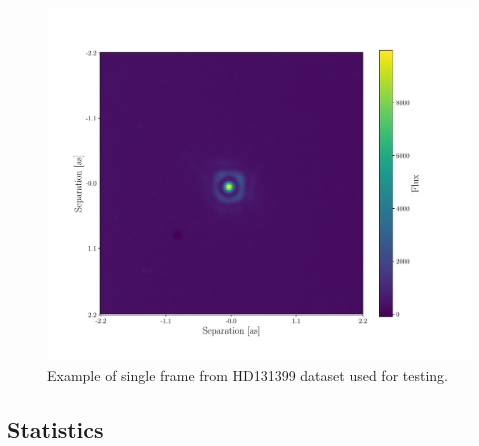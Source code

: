 \documentclass[twocolumn,fleqn]{aastex62}
\begin{document}
\begin{figure}[h]
	\hspace{-2.5em}
	\includegraphics[width=1.25\linewidth]{HD131399}
	\caption{\label{fig:TestData} Example of single frame from HD131399 dataset used for testing.}
\end{figure}

\subsection{Statistics}
\end{document}
